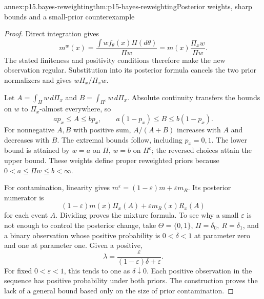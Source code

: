 \begin{annexitem}{annex:p15.bayes-reweighting}{thm:p15-bayes-reweighting}{Posterior weights, sharp bounds and a small-prior counterexample}
\begin{proof}
Direct integration gives
\[
 m^w(x)=\frac{\int wf_\theta(x)\Pi(d\theta)}{\Pi w}
       =m(x)\frac{\Pi_xw}{\Pi w}.
\]
The stated finiteness and positivity conditions therefore
make the new observation regular. Substitution into its
posterior formula cancels the two prior normalizers and
gives \(w\Pi_x/\Pi_xw\).

Let \(A=\int_Hw\,d\Pi_x\) and \(B=\int_{H^c}w\,d\Pi_x\).
Absolute continuity transfers the bounds on \(w\) to
\(\Pi_x\)-almost everywhere, so
\[
 ap_x\leq A\leq bp_x,\qquad
 a(1-p_x)\leq B\leq b(1-p_x).
\]
For nonnegative \(A,B\) with positive sum, \(A/(A+B)\)
increases with \(A\) and decreases with \(B\).
The extremal bounds follow, including \(p_x=0,1\).
The lower bound is attained by \(w=a\) on \(H\), \(w=b\)
on \(H^c\); the reversed choices attain the upper bound.
These weights define proper reweighted priors because
\(0<a\leq\Pi w\leq b<\infty\).

For contamination, linearity gives
\(m^\varepsilon=(1-\varepsilon)m+\varepsilon m_R\).
Its posterior numerator is
\[
 (1-\varepsilon)m(x)\Pi_x(A)+\varepsilon m_R(x)R_x(A)
\]
for each event \(A\). Dividing proves the mixture formula.
To see why a small \(\varepsilon\) is not enough to control
the posterior change, take \(\Theta=\{0,1\}\),
\(\Pi=\delta_0,\ R=\delta_1\), and a binary observation
whose positive probability is \(0<\delta<1\) at parameter zero
and one at parameter one. Given a positive,
\[
       \lambda=\frac{\varepsilon}
                      {(1-\varepsilon)\delta+\varepsilon}.
\]
For fixed \(0<\varepsilon<1\), this tends to one as
\(\delta\downarrow0\). Each positive observation in the
sequence has positive probability under both priors.
The construction proves the lack of a general bound
based only on the size of prior contamination.
\end{proof}
\end{annexitem}


